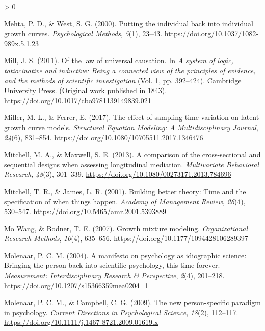 \documentclass[
12pt, %
twoside,
english]{guelphthesis}
\newlength{\cslhangindent}
\newenvironment{CSLReferences}[2] %
 {%
  \setlength{\parindent}{0pt}
  \ifodd #1 \everypar{\setlength{\hangindent}{\cslhangindent}}\ignorespaces\fi
  \ifnum #2 > 0
  \setlength{\parskip}{\linespacing{2}}
  \fi
 }%
 {}
\begin{document}
\begin{CSLReferences}{1}{0}
\leavevmode{}%
Mehta, P. D., \& West, S. G. (2000). Putting the individual back into individual growth curves. \emph{Psychological Methods}, \emph{5}(1), 23--43. \url{https://doi.org/10.1037/1082-989x.5.1.23}

\leavevmode{}%
Mill, J. S. (2011). Of the law of universal causation. In \emph{A system of logic, tatiocinative and inductive: Being a connected view of the principles of evidence, and the methods of scientific investigation} (Vol. 1, pp. 392--424). Cambridge University Press. (Original work published in 1843). \url{https://doi.org/10.1017/cbo9781139149839.021}

\leavevmode{}%
Miller, M. L., \& Ferrer, E. (2017). The effect of sampling-time variation on latent growth curve models. \emph{Structural Equation Modeling: A Multidisciplinary Journal}, \emph{24}(6), 831--854. \url{https://doi.org/10.1080/10705511.2017.1346476}

\leavevmode{}%
Mitchell, M. A., \& Maxwell, S. E. (2013). A comparison of the cross-sectional and sequential designs when assessing longitudinal mediation. \emph{Multivariate Behavioral Research}, \emph{48}(3), 301--339. \url{https://doi.org/10.1080/00273171.2013.784696}

\leavevmode{}%
Mitchell, T. R., \& James, L. R. (2001). Building better theory: Time and the specification of when things happen. \emph{Academy of Management Review}, \emph{26}(4), 530--547. \url{https://doi.org/10.5465/amr.2001.5393889}

\leavevmode{}%
Mo Wang, \& Bodner, T. E. (2007). Growth mixture modeling. \emph{Organizational Research Methods}, \emph{10}(4), 635--656. \url{https://doi.org/10.1177/1094428106289397}

\leavevmode{}%
Molenaar, P. C. M. (2004). A manifesto on psychology as idiographic science: Bringing the person back into scientific psychology, this time forever. \emph{Measurement: Interdisciplinary Research \& Perspective}, \emph{2}(4), 201--218. \url{https://doi.org/10.1207/s15366359mea0204_1}

\leavevmode{}%
Molenaar, P. C. M., \& Campbell, C. G. (2009). The new person-specific paradigm in psychology. \emph{Current Directions in Psychological Science}, \emph{18}(2), 112--117. \url{https://doi.org/10.1111/j.1467-8721.2009.01619.x}


\end{CSLReferences}
\end{document}
